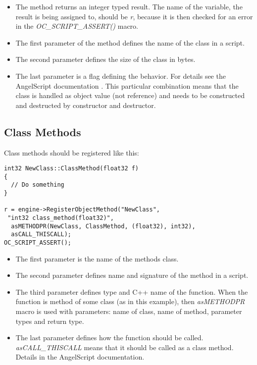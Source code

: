 \documentclass[a4paper, 12pt]{report}
\begin{document}
\begin{itemize}
\item
The method returns an integer typed result. The name of the variable, the result is being assigned to, should be \emph{r}, because it is then checked for an error in the \emph{OC\_SCRIPT\_ASSERT()} macro.

\item
The first parameter of the method defines the name of the class in a script.

\item
The second parameter defines the size of the class in bytes.

\item
The last parameter is a flag defining the behavior. For details see the AngelScript documentation \cite{angelscript}. This particular combination means that the class is handled as object value (not reference) and needs to be constructed and destructed by constructor and destructor.
\end{itemize}

\subsection{Class Methods}
Class methods should be registered like this:

\footnotesize 
\begin{verbatim}
int32 NewClass::ClassMethod(float32 f)
{
  // Do something
}

r = engine->RegisterObjectMethod("NewClass",
 "int32 class_method(float32)", 
  asMETHODPR(NewClass, ClassMethod, (float32), int32),
  asCALL_THISCALL);
OC_SCRIPT_ASSERT();
\end{verbatim}
\normalsize

\begin{itemize}
\item
The first parameter is the name of the methods class.
\item
The second parameter defines name and signature of the method in a script.
\item
The third parameter defines type and C++ name of the function. When the function is method of some class (as in this example), then \emph{asMETHODPR} macro is used with parameters: name of class, name of method, parameter types and return type.
\item
The last parameter defines how the function should be called. \emph{asCALL\_THISCALL} means that it should be called as a class method. Details in the AngelScript documentation\cite{angelscript}.
\end{itemize}
\end{document}

